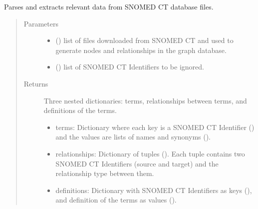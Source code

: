 \documentclass[letterpaper,10pt,english]{sphinxmanual}
\begin{document}
\begin{fulllineitems}
\label{\detokenize{_autosummary/graphdb_builder.ontologies.parsers:graphdb_builder.ontologies.parsers.snomedParser.parser}}
Parses and extracts relevant data from SNOMED CT database files.
\begin{quote}\begin{description}
\item[{Parameters}] \leavevmode\begin{itemize}
\item {} 
 () \textendash{} list of files downloaded from SNOMED CT and used to generate nodes and relationships in the graph database.

\item {} 
 () \textendash{} list of SNOMED CT Identifiers to be ignored.

\end{itemize}

\item[{Returns}] \leavevmode

Three nested dictionaries: terms, relationships between terms, and definitions of the terms.
\begin{itemize}
\item {} 
terms: Dictionary where each key is a SNOMED CT Identifier () and the values are lists of names and synonyms ().

\item {} 
relationships: Dictionary of tuples (). Each tuple contains two SNOMED CT Identifiers (source and target) and                         the relationship type between them.

\item {} 
definitions: Dictionary with SNOMED CT Identifiers as keys (), and definition of the terms as values ().

\end{itemize}


\end{description}\end{quote}

\end{fulllineitems}
\end{document}
